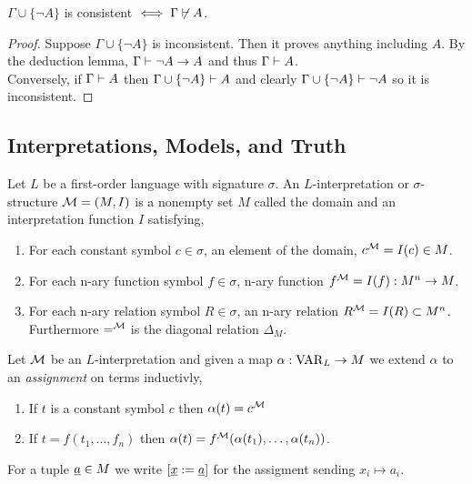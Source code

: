 \documentclass[12pt]{article}
\begin{document}
\begin{lemma}
$\Gamma \cup \{ \neg A \}$ is consistent $\iff \Gamma \not\vdash A$.
\end{lemma}

\begin{proof}
Suppose $\Gamma \cup \{ \neg A \}$ is inconsistent. Then it proves anything including $A$. By the deduction lemma, $\Gamma \vdash \neg A \to A$ and thus $\Gamma \vdash A$.
\bigskip\\
Conversely,
if $\Gamma \vdash A$ then $\Gamma \cup \{ \neg A \} \vdash A$ and clearly $\Gamma \cup \{ \neg A \} \vdash \neg A$ so it is inconsistent. 
\end{proof}

\subsection{Interpretations, Models, and Truth}

\begin{definition}
Let $L$ be a first-order language with signature $\sigma$. An $L$-interpretation or $\sigma$-structure $\mathcal{M} = (M, I)$ is a nonempty set $M$ called the domain and an interpretation function $I$ satisfying,
\begin{enumerate}
\item For each constant symbol $c \in \sigma$, an element of the domain, $c^{\mathcal{M}} = I(c) \in M$.
\item For each n-ary function symbol $f \in \sigma$, n-ary function $f^{\mathcal{M}} = I(f) : M^n \to M$.
\item For each n-ary relation symbol $R \in \sigma$, an n-ary relation $R^{\mathcal{M}} = I(R) \subset M^n$. Furthermore $=^{\mathcal{M}}$ is the diagonal relation $\Delta_M$.
\end{enumerate}
\end{definition}

\begin{definition}
Let $\mathcal{M}$ be an $L$-interpretation and given a map $\alpha : \mathrm{VAR}_{L} \to M$ we extend $\alpha$ to an \textit{assignment} on terms inductivly,
\begin{enumerate}
\item If $t$ is a constant symbol $c$ then $\alpha(t) = c^{\mathcal{M}}$
\item If $t = f(t_1, \dots, f_n)$ then $\alpha(t) = f^{\mathcal{M}}(\alpha(t_1), \dots, \alpha(t_n))$.  
\end{enumerate} 
For a tuple $\underline{a} \in M$ we write $[\underline{x} := \underline{a}]$ for the assigment sending $x_i \mapsto a_i$.
\end{definition}
\end{document}

